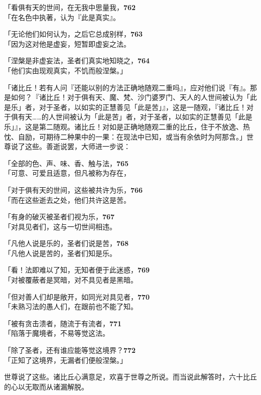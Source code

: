「看俱有天的世间，在无我中思量我，\hfill{\grayfootnotesize \textbf{762}} \\
「在名色中执著，认为『此是真实』。


「无论他们如何认为，之后它总成别样，\hfill{\grayfootnotesize \textbf{763}} \\
「因为这对他是虚妄，短暂即虚妄之法。


「涅槃是非虚妄法，圣者们真实地知晓之，\hfill{\grayfootnotesize \textbf{764}} \\
「他们实由现观真实，不饥而般涅槃。」


「诸比丘！若有人问『还能以别的方法正确地随观二重吗』，应对他们说『有』。那是如何？『诸比丘！对于俱有天、魔、梵、沙门婆罗门、天人的人世间被认为「此是乐」者，对于圣者，以如实的正慧善见「此是苦」』，这是一随观，『诸比丘！对于俱有天……的人世间被认为「此是苦」者，对于圣者，以如实的正慧善见「此是乐」』，这是第二随观。诸比丘！对如是正确地随观二重的比丘，住于不放逸、热忱、自励，可期待二种果中的一果：在现法中已知，或当有余依时为阿那含。」世尊说了这些。善逝说罢，大师进一步说：


「全部的色、声、味、香、触与法，\hfill{\grayfootnotesize \textbf{765}} \\
「可意、可爱且适意，但凡被称为存在，


「对于俱有天的世间，这些被共许为乐，\hfill{\grayfootnotesize \textbf{766}} \\
「而在这些逝去之处，他们共许这是苦。


「有身的破灭被圣者们视为乐，\hfill{\grayfootnotesize \textbf{767}} \\
「对具见者们，这与一切世间相违。


「凡他人说是乐的，圣者们说是苦，\hfill{\grayfootnotesize \textbf{768}} \\
「凡他人说是苦的，圣者们知是乐。


「看！法即难以了知，无知者便于此迷惑，\hfill{\grayfootnotesize \textbf{769}} \\
「对被覆蔽者是冥暗，对不具见者是黑暗。


「但对善人们却是敞开，如同光对具见者，\hfill{\grayfootnotesize \textbf{770}} \\
「未熟习法的愚人们，在跟前也不能了知。


「被有贪击溃者，随流于有流者，\hfill{\grayfootnotesize \textbf{771}} \\
「陷落于魔境者，不易等觉这法。


「除了圣者，还有谁应能等觉这境界？\hfill{\grayfootnotesize \textbf{772}} \\
「正知了这境界，无漏者们便般涅槃。」


世尊说了这些。诸比丘心满意足，欢喜于世尊之所说。而当说此解答时，六十比丘的心以无取而从诸漏解脱。
